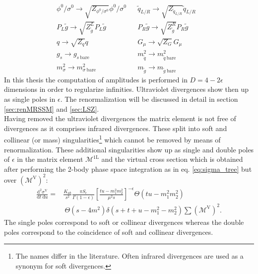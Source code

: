 \begin{align}
& \phi^0 / \sigma^0 \to \sqrt{Z_{\phi^0 / \sigma^0}}\phi^0 / \sigma^0 && \tilde{q}_{L/R} \to \sqrt{Z_{\tilde{q}_{L/R}}}\tilde{q}_{L/R}\nonumber\\
& P_L \tilde{g} \to \sqrt{Z_{\tilde{g}}^L} P_L \tilde{g} && P_R \tilde{g} \to \sqrt{Z_{\tilde{g}}^R} P_R \tilde{g}\nonumber\\
& q \to \sqrt{Z_q}q && G_\mu \to \sqrt{Z_G} G_\mu && \label{eq:fieldtrafo}\\
& g_s \to g_{s\ \mathrm{bare}} && m_{\tilde{q}}^2 \to m_{\tilde{q}\ \mathrm{bare}}^2\nonumber\\
&  m_{\sigma}^2 \to m_{\sigma\ \mathrm{bare}}^2 && m_{\tilde{g}} \to m_{\tilde{g}\ \mathrm{bare}}\label{eq:parametertrafo}
\end{align}
In this thesis the computation of amplitudes is performed in $D = 4-2\epsilon$ dimensions in order to regularize infinities. Ultraviolet divergences show then up as single poles in $\epsilon$. The renormalization will be discussed in detail in section \ref{sec:renMRSSM} and \ref{sec:LSZ}.\\
Having removed the ultraviolet divergences the matrix element is not free of divergences as it comprises infrared divergences. These split into soft and collinear (or mass) singularities\footnote{The names differ in the literature. Often infrared divergences are used as a synonym for soft divergences.} which cannot be removed by means of renormalization. These additional singularities show up as single and double poles of $\epsilon$ in the matrix element $\mathcal{M^{\mathrm{1L}}}$ and the virtual cross section which is obtained after performing the 2-body phase space  integration as in eq. \eqref{eq:sigma_tree} but over $\left(\mathcal{M^{\mathrm{V}}}\right)^2$:
\begin{align}
\frac{\mbox{d}^2 \sigma^{\mathrm{V}}}{\mbox{d}t\ \mbox{d}u} =& \frac{K_{ab}}{s^2} \frac{\pi S_{\epsilon}}{\Gamma(1-\epsilon)} \left[ \frac{tu-m_1^2m_2^2}{\mu^2 s}\right]^{-\epsilon} \Theta(tu-m_1^2m_2^2)\nonumber\\
&\ \Theta(s-4m^2) \delta(s+t+u-m_1^2-m_2^2) \sum \left(\mathcal{M}^{\mathrm{V}}\right)^2.\label{eq:diffsigma}
\end{align}
The single poles correspond to soft or collinear divergences whereas the double poles correspond to the coincidence of soft and collinear divergences.


